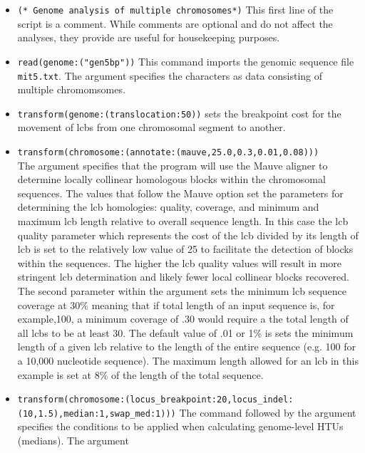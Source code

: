 \begin{itemize}
\item \texttt{(* Genome analysis of multiple chromosomes*)} This first line of the script is a comment. While 
comments are optional and do not affect the analyses, they provide are useful for housekeeping purposes.
\item \texttt{read(genome:("gen5bp"))} This command imports the genomic sequence file \texttt{mit5.txt}. The 
argument  specifies the characters as data consisting of multiple chromomsomes.
\item \texttt{transform(genome:(translocation:50))} sets the breakpoint cost for the movement of lcbs from one 
chromosomal segment to another. 
\item \texttt{transform(chromosome:(annotate:(mauve,25.0,0.3,0.01,0.08)))} \\The argument  specifies that the program will use the Mauve aligner \cite{darlingetal2004} to determine locally collinear 
homologous blocks within the chromosomal sequences.  The values that follow the Mauve option set the parameters 
for determining the lcb homologies: quality, coverage, and minimum and maximum lcb length relative to overall 
sequence length. In this case the lcb quality parameter which represents the cost of the lcb divided by its length of lcb
 is set to the relatively low value of 25 to facilitate the detection of blocks within the sequences.  The higher the lcb 
 quality values will result in more stringent lcb determination and likely fewer local collinear blocks recovered.  The 
 second parameter within the argument  sets the minimum lcb sequence coverage 
 at  30\% meaning that if total length of an input sequence is, for example,100, a minimum coverage of .30 would 
 require  a the total length of all lcbs to be at least 30. The default value of .01 or 1\% is sets the minimum length of a 
 given lcb  relative to the length of the entire sequence (e.g. 100 for a 10,000 nucleotide sequence). The maximum 
 length  allowed for an lcb in this example is set at 8\% of the length of the total sequence.
\item \texttt{transform(chromosome:(locus\_breakpoint:20,locus\_indel:\\(10,1.5),median:1,swap\_med:1)))}  The command 
 followed by the argument  specifies the conditions to be 
applied when calculating genome-level HTUs (medians). The argument  

\end{itemize}
